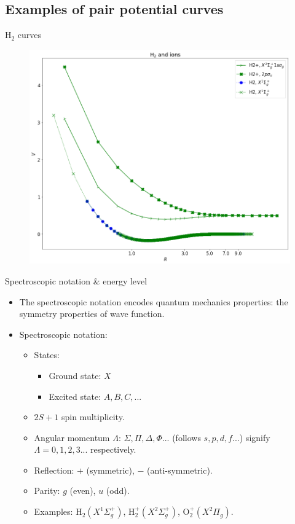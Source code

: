 \documentclass{beamer}
\begin{document}
\subsection{Examples of pair potential curves}
\begin{frame}{H$_2$ curves}
    \begin{figure}[h]
        \centering
        \includegraphics[scale=0.27]{img/H2_and_ions.png}
        \label{fig:h2}
    \end{figure}
\end{frame}
\begin{frame}{Spectroscopic notation \& energy level}
    \begin{itemize}
        \item The spectroscopic notation encodes quantum mechanics properties: the symmetry properties of wave function.
        \item Spectroscopic notation:
        \begin{itemize}
            \item States:
            \begin{itemize}
                \item Ground state: $X$
                \item Excited state: $A, B, C,$...
            \end{itemize}
            \item $2S+1$ spin multiplicity.
            \item Angular momentum $\Lambda$: $\Sigma, \Pi, \Delta, \Phi ... $ (follows $s, p, d, f...$) signify $\Lambda = 0, 1, 2, 3 ...$ respectively.
            \item Reflection: $+$ (symmetric), $-$ (anti-symmetric).
            \item Parity: $g$ (even), $u$ (odd).
            \item Examples: H$_2(X^1\Sigma_g^+)$, H$_2^+(X^2\Sigma_g^+)$, O$_2^+(X^2\Pi_g)$.
        \end{itemize}
    \end{itemize}
\end{frame}
\end{document}

